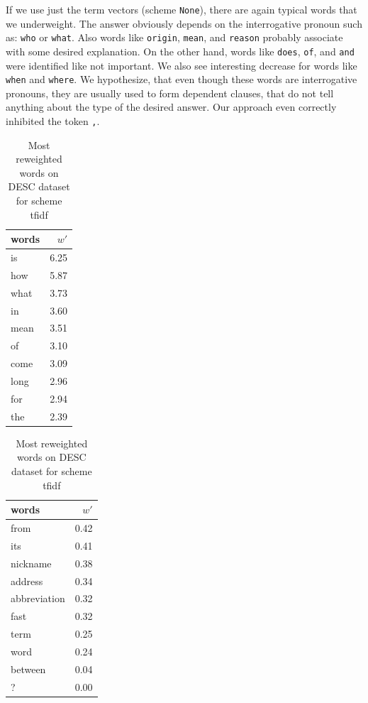     If we use just the term vectors (scheme \texttt{None}), there are again typical words that we underweight.
    The answer obviously depends on the interrogative pronoun such as: \texttt{who} or \texttt{what}.
    Also words like \texttt{origin}, \texttt{mean}, and \texttt{reason} probably associate with some desired explanation.
    On the other hand, words like \texttt{does}, \texttt{of}, and \texttt{and} were identified like not important.
    We also see interesting decrease for words like \texttt{when} and \texttt{where}.
    We hypothesize, that even though these words are interrogative pronouns, they are usually used to form dependent clauses, that do not tell anything about the type of the desired answer.
    Our approach even correctly inhibited the token \texttt{,}.
 

\begin{table}[h]
    \centering
    \begin{minipage}{.4\linewidth}
      \centering
        \begin{tabular}{lr}
\toprule
words &  $w'$ \\
\midrule
   is &  6.25 \\
  how &  5.87 \\
 what &  3.73 \\
   in &  3.60 \\
 mean &  3.51 \\
   of &  3.10 \\
 come &  3.09 \\
 long &  2.96 \\
  for &  2.94 \\
  the &  2.39 \\
\bottomrule
\end{tabular}

    \end{minipage}
    \begin{minipage}{.4\linewidth}
      \centering
        \begin{tabular}{lr}
\toprule
        words &  $w'$ \\
\midrule
         from &  0.42 \\
          its &  0.41 \\
     nickname &  0.38 \\
      address &  0.34 \\
 abbreviation &  0.32 \\
         fast &  0.32 \\
         term &  0.25 \\
         word &  0.24 \\
      between &  0.04 \\
            ? &  0.00 \\
\bottomrule
\end{tabular}

    \end{minipage} 
    \caption{Most reweighted words on DESC dataset for scheme tfidf}
    \label{tab:words:trec:tfidf}
\end{table}


